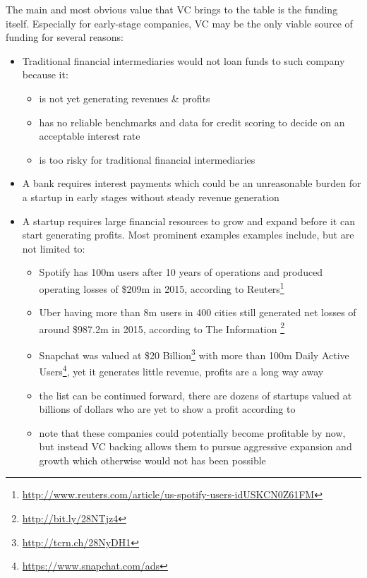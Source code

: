The main and most obvious value that VC brings to the table is the funding itself. Especially for early-stage companies, VC may be the only viable source of funding \parencite{darin:2011} for several reasons:
\begin{itemize}
    \item Traditional financial intermediaries would not loan funds to such company because it:
    \begin{itemize}
        \item is not yet generating revenues \& profits
        \item has no reliable benchmarks and data for credit scoring to decide on an acceptable interest rate
        \item is too risky for traditional financial intermediaries
    \end{itemize}
    \item A bank requires interest payments which could be an unreasonable burden for a startup in early stages without steady revenue generation
    \item A startup requires large financial resources to grow and expand before it can start generating profits. Most prominent examples examples include, but are not limited to:
    \begin{itemize}
        \item Spotify has 100m users after 10 years of operations and produced operating losses of \$209m in 2015, according to Reuters\footnote{\url{http://www.reuters.com/article/us-spotify-users-idUSKCN0Z61FM}}
        \item Uber having more than 8m users in 400 cities still generated net losses of around \$987.2m in 2015, according to The Information \footnote{\url{http://bit.ly/28NTjz4}}
        \item Snapchat was valued at \$20 Billion\footnote{\url{http://tcrn.ch/28NyDH1}} with more than 100m Daily Active Users\footnote{\url{https://www.snapchat.com/ads}}, yet it generates little revenue, profits are a long way away
        \item the list can be continued forward, there are dozens of startups valued at billions of dollars who are yet to show a profit according to \parencite{cnn:2015}
        \item note that these companies could potentially become profitable by now, but instead VC backing allows them to pursue aggressive expansion and growth which otherwise would not has been possible
    \end{itemize}
    
\end{itemize}

